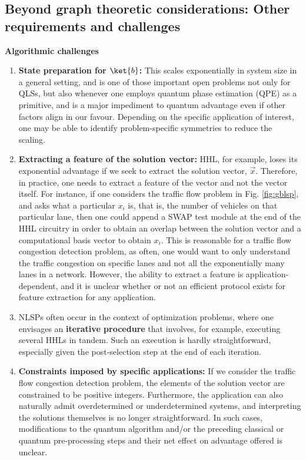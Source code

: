 \documentclass[%
 reprint,
 superscriptaddress,
 amsmath,amssymb,
 aps,
 pra,
floatfix,
nofootinbib,
]{revtex4-2}
\theoremstyle{definition}
\theoremstyle{remark}
\newcommand{\appsubsection}[1]{%
  \refstepcounter{subsection}%
  \bigskip
  \noindent\textbf{\thesubsection\quad #1}\par
  \smallskip
}
\begin{document}
\begin{appendix}
\section{Beyond graph theoretic considerations: Other requirements and challenges} \label{sec:req} 


\appsubsection{Algorithmic challenges} 

\begin{enumerate} 
\item \textbf{State preparation for $\ket{b}$:} This scales exponentially in system size in a general setting, and is one of those important open problems not only for QLSs, but also whenever one employs quantum phase estimation (QPE) as a primitive, and is a major impediment to quantum advantage even if other factors align in our favour. Depending on the specific application of interest, one may be able to identify problem-specific symmetries to reduce the scaling. 

\item \textbf{Extracting a feature of the solution vector:} HHL, for example, loses its exponential advantage if we seek to extract the solution vector, $\vec{x}$. Therefore, in practice, one needs to extract a feature of the vector and not the vector itself. For instance, if one considers the traffic flow problem in Fig. \ref{fig:gblsp}, and asks what a particular $x_i$ is, that is, the number of vehicles on that particular lane, then one could append a SWAP test module at the end of the HHL circuitry in order to obtain an overlap between the solution vector and a computational basis vector to obtain $x_i$. This is reasonable for a traffic flow congestion detection problem, as often, one would want to only understand the traffic congestion on specific lanes and not all the exponentially many lanes in a network. However, the ability to extract a feature is application-dependent, and it is unclear whether or not an efficient protocol exists for feature extraction for any application. 

\item NLSPs often occur in the context of optimization problems, where one envisages an \textbf{iterative procedure} that involves, for example, executing several HHLs in tandem. Such an execution is hardly straightforward, especially given the post-selection step at the end of each iteration. 

\item \textbf{Constraints imposed by specific applications: }If we consider the traffic flow congestion detection problem, the elements of the solution vector are constrained to be positive integers. Furthermore, the application can also naturally admit overdetermined or underdetermined systems, and interpreting the solutions themselves is no longer straightforward. In such cases, modifications to the quantum algorithm and/or the preceding classical or quantum pre-processing steps and their net effect on advantage offered is unclear. 
\end{enumerate} 



\end{appendix}
\end{document}

